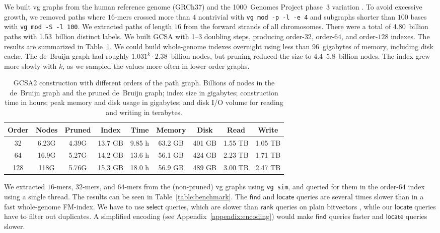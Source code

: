 \documentclass[a4paper,UKenglish]{lipics-v2016}
\newcommand{\rank}{\ensuremath{\mathsf{rank}}}
\newcommand{\select}{\ensuremath{\mathsf{select}}}
\newcommand{\find}{\ensuremath{\mathsf{find}}}
\newcommand{\locate}{\ensuremath{\mathsf{locate}}}
\newcommand{\kmer}[1]{$#1$\nobreakdash-mer}
\newcommand{\orderk}[1]{order\nobreakdash-$#1$}
\begin{document}
We built vg graphs from the human reference genome (GRCh37) and the 1000~Genomes Project phase~3 variation \cite{1000GP2015}. To avoid excessive growth, we removed paths where \kmer{16}s crossed more than $4$ nontrivial with \texttt{vg mod -p -l -e 4} and subgraphs shorter than $100$ bases with \texttt{vg mod -S -l 100}. We extracted paths of length $16$ from the forward strands of all chromosomes. There were a total of 4.80~billion paths with 1.53~billion distinct labels. We built GCSA with 1\nobreakdash--3 doubling steps, producing \orderk{32}, \orderk{64}, and \orderk{128} indexes. The results are summarized in Table~\ref{table:construction}.  We could build whole-genome indexes overnight using less than 96~gigabytes of memory, including disk cache. The de~Bruijn graph had roughly $1.031^{k} \cdot 2.38$~billion nodes, but pruning reduced the size to 4.4\nobreakdash--5.8~billion nodes. The index grew more slowly with $k$, as we sampled the values more often in lower order graphs.

\begin{table}[t!]
\begin{center}
\caption{GCSA2 construction with different orders of the path graph. Billions of nodes in the de~Bruijn graph and the pruned de~Bruijn graph; index size in gigabytes; construction time in hours; peak memory and disk usage in gigabytes; and disk I/O volume for reading and writing in terabytes.}\label{table:construction}
\begin{tabular}{c|ccc|ccc|cc}
\hline
\textbf{Order} & \textbf{Nodes} & \textbf{Pruned} & \textbf{Index} & \textbf{Time} & \textbf{Memory} & \textbf{Disk} & \textbf{Read} & \textbf{Write} \\
\hline
 32 & 6.23G & 4.39G & 13.7 GB & 9.85 h & 63.2 GB & 401 GB & 1.55 TB & 1.05 TB \\
 64 & 16.9G & 5.27G & 14.2 GB & 13.6 h & 56.1 GB & 424 GB & 2.23 TB & 1.71 TB \\
128 &  118G & 5.76G & 15.3 GB & 18.0 h & 56.9 GB & 489 GB & 3.00 TB & 2.47 TB \\
\hline
\end{tabular}
\end{center}
\end{table}

We extracted \kmer{16}s, \kmer{32}s, and \kmer{64}s from the (non-pruned) vg graphs using \texttt{vg sim}, and queried for them in the \orderk{64} index using a single thread. The results can be seen in Table~\ref{table:benchmark}. The $\find$ and $\locate$ queries are several times slower than in a fast whole-genome FM\nobreakdash-index. We have to use $\select$ queries, which are slower than $\rank$ queries on plain bitvectors \cite{Gog2014}, while our $\locate$ queries have to filter out duplicates. A simplified encoding (see Appendix~\ref{appendix:encoding}) would make $\find$ queries faster and $\locate$ queries slower.
\end{document}
